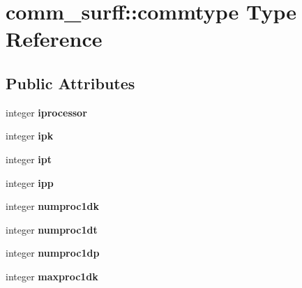\hypertarget{structcomm__surff_1_1commtype}{}\section{comm\+\_\+surff\+:\+:commtype Type Reference}
\label{structcomm__surff_1_1commtype}
\subsection*{Public Attributes}
\begin{DoxyCompactItemize}
\item 
\mbox{\label{structcomm__surff_1_1commtype_acb1665c6ecdd1514489c9392097b7c05}} 
integer {\bfseries iprocessor}
\item 
\mbox{\label{structcomm__surff_1_1commtype_ad7edf67b93dcb268b1328e1e7fcb0417}} 
integer {\bfseries ipk}
\item 
\mbox{\label{structcomm__surff_1_1commtype_a833cdda0f563e08ac971be0e62ac5601}} 
integer {\bfseries ipt}
\item 
\mbox{\label{structcomm__surff_1_1commtype_a28d08e96147fe880383339f18d6b518a}} 
integer {\bfseries ipp}
\item 
\mbox{\label{structcomm__surff_1_1commtype_a17fbf61d415ebf5d751ef31372d3a352}} 
integer {\bfseries numproc1dk}
\item 
\mbox{\label{structcomm__surff_1_1commtype_aac3b511e47cae2a3c8b6a7c526837697}} 
integer {\bfseries numproc1dt}
\item 
\mbox{\label{structcomm__surff_1_1commtype_a218e0690756ea1cda9841b0a5917eb4e}} 
integer {\bfseries numproc1dp}
\item 
\mbox{\label{structcomm__surff_1_1commtype_a5a21bb7fc4e18a31f3d6e31838201963}} 
integer {\bfseries maxproc1dk}
\item 
\mbox{\label{structcomm__surff_1_1commtype_a6ffee9d86941de4a02932d42742627e9}} 

\end{DoxyCompactItemize}
